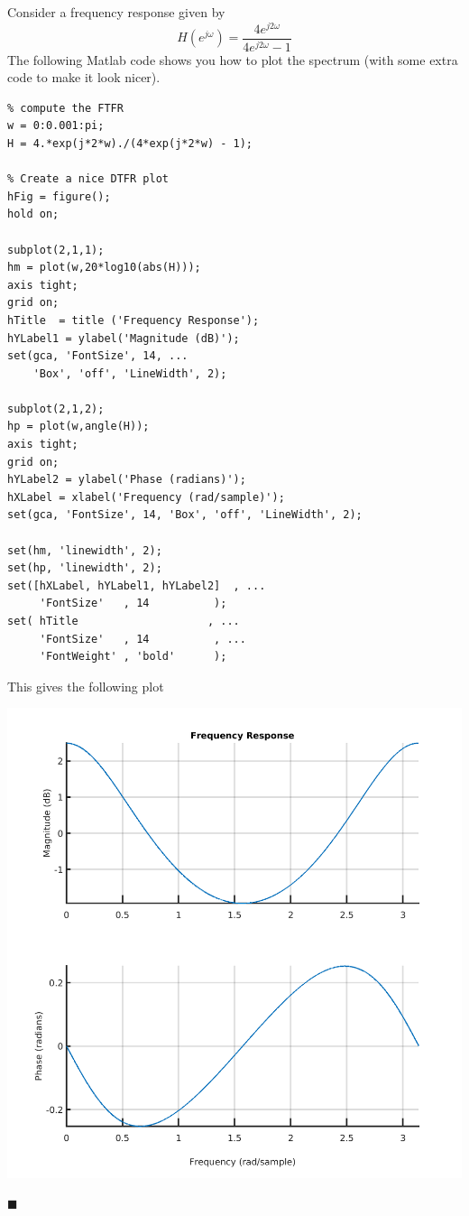 \begin{example} Consider a frequency response given by
  \[
  H\left(e^{j\omega}\right) = \frac{4e^{j2\omega}}{4e^{j2\omega} - 1} 
  \]
  The following Matlab code shows you how to plot the spectrum (with some extra code to make it look nicer).
  
\begin{verbatim}
% compute the FTFR
w = 0:0.001:pi;
H = 4.*exp(j*2*w)./(4*exp(j*2*w) - 1);

% Create a nice DTFR plot 
hFig = figure();
hold on;

subplot(2,1,1);
hm = plot(w,20*log10(abs(H)));
axis tight;
grid on;
hTitle  = title ('Frequency Response');
hYLabel1 = ylabel('Magnitude (dB)');
set(gca, 'FontSize', 14, ...
    'Box', 'off', 'LineWidth', 2);

subplot(2,1,2);
hp = plot(w,angle(H));
axis tight;
grid on;
hYLabel2 = ylabel('Phase (radians)');
hXLabel = xlabel('Frequency (rad/sample)');
set(gca, 'FontSize', 14, 'Box', 'off', 'LineWidth', 2);

set(hm, 'linewidth', 2);
set(hp, 'linewidth', 2);
set([hXLabel, hYLabel1, hYLabel2]  , ...
     'FontSize'   , 14          );
set( hTitle                    , ...
     'FontSize'   , 14          , ...
     'FontWeight' , 'bold'      );
\end{verbatim}
This gives the following plot
\begin{center}
\includegraphics[scale=0.5]{graphics/lecture21_1.png}
\end{center}

$\blacksquare$
\end{example}

